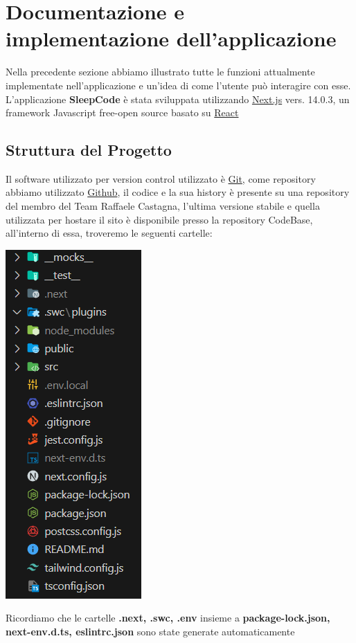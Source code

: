 \documentclass[11pt, a4paper]{article}
\theoremstyle{definition}
\begin{document}
\newpage
\section{Documentazione e implementazione dell'applicazione}
Nella precedente sezione abbiamo illustrato tutte le funzioni attualmente implementate nell'applicazione e un'idea di come l'utente può interagire con esse.
L'applicazione \textbf{SleepCode} è stata sviluppata utilizzando \href{https://nextjs.org/}{Next.js} vers. 14.0.3, un framework Javascript free-open source basato su \href{https://react.dev/}{React}
\newpage
\subsection{Struttura del Progetto}
Il software utilizzato per version control utilizzato è \href{https://git-scm.com/}{Git}, come repository abbiamo utilizzato \href{www.github.com}{Github},
il codice e la sua history è presente su una repository del membro del Team Raffaele Castagna, l'ultima versione stabile e quella utilizzata per hostare il sito è disponibile presso la repository CodeBase, all'interno di essa,
troveremo le seguenti cartelle:
\\
\begin{center}
  \includegraphics{materiale/Project Structure.png}
\end{center}
Ricordiamo che le cartelle \textbf{.next, .swc, .env} insieme a \textbf{package-lock.json, next-env.d.ts, eslintrc.json} sono state generate automaticamente
\newpage
\end{document}
